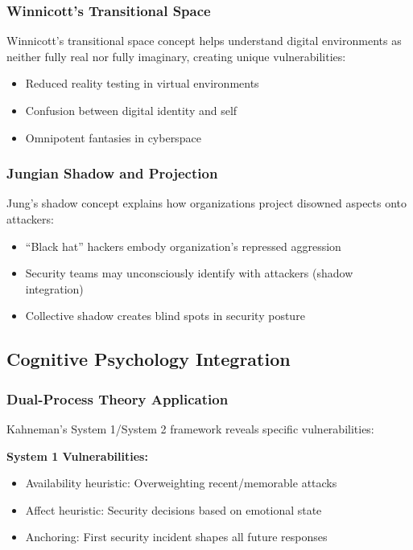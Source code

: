 \documentclass[11pt,a4paper]{article}
\begin{document}
\subsubsection{Winnicott's Transitional Space}

Winnicott's\cite{winnicott1971} transitional space concept helps understand digital environments as neither fully real nor fully imaginary, creating unique vulnerabilities:
\begin{itemize}
\item Reduced reality testing in virtual environments
\item Confusion between digital identity and self
\item Omnipotent fantasies in cyberspace
\end{itemize}

\subsubsection{Jungian Shadow and Projection}

Jung's\cite{jung1969} shadow concept explains how organizations project disowned aspects onto attackers:
\begin{itemize}
\item ``Black hat'' hackers embody organization's repressed aggression
\item Security teams may unconsciously identify with attackers (shadow integration)
\item Collective shadow creates blind spots in security posture
\end{itemize}

\subsection{Cognitive Psychology Integration}

\subsubsection{Dual-Process Theory Application}

Kahneman's\cite{kahneman2011} System 1/System 2 framework reveals specific vulnerabilities:

\textbf{System 1 Vulnerabilities:}
\begin{itemize}
\item Availability heuristic: Overweighting recent/memorable attacks
\item Affect heuristic: Security decisions based on emotional state
\item Anchoring: First security incident shapes all future responses
\end{itemize}
\end{document}
